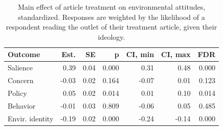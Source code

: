 \begin{table}[h!t]
\centering
\begin{tabular}{lrrrrrr}
  \hline
Outcome & Est. & SE & p & CI, min & CI, max & FDR \\ 
  \hline
Salience & 0.39 & 0.04 & 0.000 & 0.31 & 0.48 & 0.000 \\ 
  Concern & -0.03 & 0.02 & 0.164 & -0.07 & 0.01 & 0.123 \\ 
  Policy & 0.05 & 0.02 & 0.014 & 0.01 & 0.10 & 0.014 \\ 
  Behavior & -0.01 & 0.03 & 0.809 & -0.06 & 0.05 & 0.485 \\ 
  Envir. identity & -0.19 & 0.02 & 0.000 & -0.24 & -0.14 & 0.000 \\ 
   \hline
\end{tabular}
\caption{Main effect of article treatment on environmental attitudes, standardized.
                   Responses are weighted by the likelihood of a respondent reading the outlet of their treatment article,
                   given their ideology.} 
\label{tab:main_ideoweights}
\end{table}
